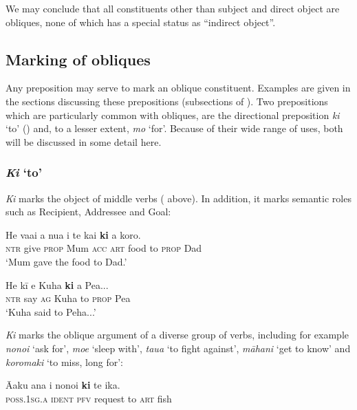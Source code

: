 We may conclude that all constituents other than subject and direct object are obliques, none of which has a special status as “indirect object”.
\subsection{Marking of obliques}\label{sec:8.8.2}

Any preposition may serve to mark an oblique constituent. Examples are given in the sections discussing these prepositions (subsections of ). Two prepositions which are particularly common with obliques, are the directional preposition \textit{ki} ‘to’ () and, to a lesser extent, \textit{mo} ‘for’. Because of their wide range of uses, both will be discussed in some detail here.

\subsubsection{\textit{Ki} ‘to’}
\textit{Ki} marks the object of middle verbs ( above). In addition, it marks semantic roles such as Recipient, Addressee and Goal:

\ea\label{ex:8.173}
\gll He va{\ꞌ}ai a nua i te kai \textbf{ki} a koro. \\
\textsc{ntr} give \textsc{prop} Mum \textsc{acc} \textsc{art} food to \textsc{prop} Dad \\

\glt 
‘Mum gave the food to Dad.’ \textstyleExampleref{[R236.078]} 
\z

\ea\label{ex:8.174}
\gll He kī e Kuha \textbf{ki} a Pea... \\
\textsc{ntr} say \textsc{ag} Kuha to \textsc{prop} Pea \\

\glt
‘Kuha said to Peha...’ \textstyleExampleref{[R229.034]} 
\z

\textit{Ki} marks the oblique argument of a diverse group of verbs, including for example \textit{\mbox{nono{\ꞌ}i}} ‘ask for’, \textit{moe} ‘sleep with’, \textit{tau{\ꞌ}a} ‘to fight against’, \textit{māhani} ‘get to know’ and \textit{koromaki} ‘to miss, long for’:

\ea\label{ex:8.175}
\gll {\ꞌ}Ā{\ꞌ}aku {\ꞌ}ana i nono{\ꞌ}i \textbf{ki} te ika. \\
\textsc{poss.1sg.a} \textsc{ident} \textsc{pfv} request to \textsc{art} fish \\

